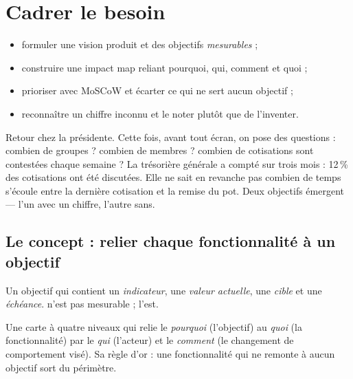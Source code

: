 \chapter{Cadrer le besoin}\label{ch:cadrage}

\begin{objectifs}
\begin{itemize}
  \item formuler une vision produit et des objectifs \emph{mesurables} ;
  \item construire une impact map reliant pourquoi, qui, comment et quoi ;
  \item prioriser avec MoSCoW et écarter ce qui ne sert aucun objectif ;
  \item reconnaître un chiffre inconnu et le noter  plutôt que de l'inventer.
\end{itemize}
\end{objectifs}

\begin{situation}
Retour chez la présidente. Cette fois, avant tout écran, on pose des questions : combien de
groupes ? combien de membres ? combien de cotisations sont contestées chaque semaine ? La
trésorière générale a compté sur trois mois : 12\,\% des cotisations ont été discutées. Elle ne sait en
revanche pas combien de temps s'écoule entre la dernière cotisation et la remise du pot. Deux
objectifs émergent --- l'un avec un chiffre, l'autre sans.
\end{situation}

\section{Le concept : relier chaque fonctionnalité à un objectif}
\begin{concept}
Un objectif qui contient un \emph{indicateur}, une \emph{valeur actuelle}, une \emph{cible} et une
\emph{échéance}.  n'est pas mesurable ;  l'est.
\end{concept}

\begin{concept}
Une carte à quatre niveaux qui relie le \emph{pourquoi} (l'objectif) au \emph{quoi} (la fonctionnalité)
par le \emph{qui} (l'acteur) et le \emph{comment} (le changement de comportement visé). Sa règle
d'or : une fonctionnalité qui ne remonte à aucun objectif sort du périmètre.
\end{concept}

